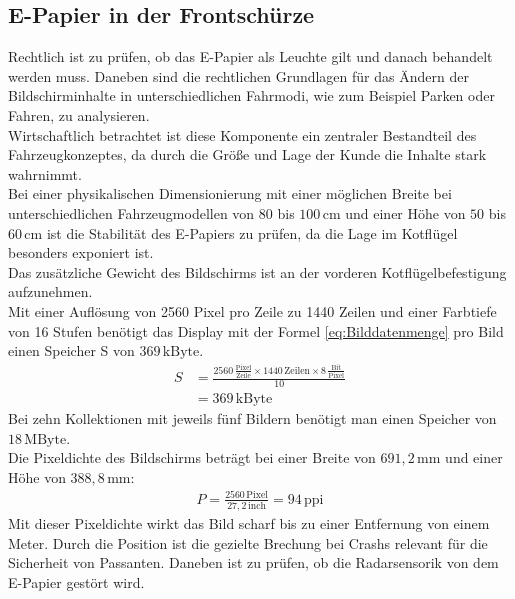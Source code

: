 \subsection{E-Papier in der Frontschürze}
Rechtlich ist zu prüfen, ob das E-Papier als Leuchte gilt und danach behandelt werden muss. Daneben sind die rechtlichen Grundlagen für das Ändern der Bildschirminhalte in unterschiedlichen Fahrmodi, wie zum Beispiel Parken oder Fahren, zu analysieren. \\
Wirtschaftlich betrachtet ist diese Komponente ein zentraler Bestandteil des Fahrzeugkonzeptes, da durch die Größe und Lage der Kunde die Inhalte stark wahrnimmt. \\
Bei einer physikalischen Dimensionierung mit einer möglichen Breite bei unterschiedlichen Fahrzeugmodellen von $ 80 $ bis $ 100\,\mathrm{cm} $ und einer Höhe von $ 50 $ bis $ 60\,\mathrm{cm} $ ist die Stabilität des E-Papiers zu prüfen, da die Lage im Kotflügel besonders exponiert ist. \\ 
Das zusätzliche Gewicht des Bildschirms ist an der vorderen Kotflügelbefestigung aufzunehmen. \\
Mit einer Auflösung von 2560 Pixel pro Zeile zu 1440 Zeilen und einer Farbtiefe von 16 Stufen benötigt das Display mit der Formel \ref{eq:Bilddatenmenge} pro Bild einen Speicher S von $ 369\,\mathrm{kByte} $. 
\begin{align}
	S &= \frac{2560\,\frac{\mathrm{Pixel}}{\mathrm{Zeile}}\times 1440\,\mathrm{Zeilen} \times 8\,\frac{\mathrm{Bit}}{\mathrm{Pixel}}}{10} \\
	&=  369\,\mathrm{kByte}
\end{align}
Bei zehn Kollektionen mit jeweils fünf Bildern benötigt man einen Speicher von $ 18\,\mathrm{MByte} $. \\
Die Pixeldichte des Bildschirms beträgt bei einer Breite von $ 691,2\,\mathrm{mm} $ und einer Höhe von $ 388,8\,\mathrm{mm} $:
\begin{align}
	P = \frac{2560\,\mathrm{Pixel}}{27,2\,\mathrm{inch}} = 94\,\mathrm{ppi}
\end{align}
Mit dieser Pixeldichte wirkt das Bild scharf bis zu einer Entfernung von einem Meter.
Durch die Position ist die gezielte Brechung bei Crashs relevant für die Sicherheit von Passanten.
Daneben ist zu prüfen, ob die Radarsensorik von dem E-Papier gestört wird.\\
